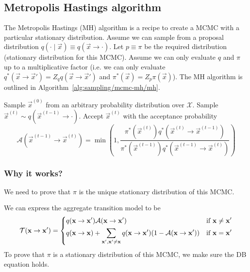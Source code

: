 \subsection{Metropolis Hastings algorithm}
\label{subsec:sampling/mcmc-mh/mh}
The Metropolis Hastings (MH) algorithm is a recipe to create a MCMC with a particular stationary distribution. Assume we can sample from a proposal distribution $q(\cdot \mid \vec x) \equiv q(\vec x \to \cdot)$. Let $p \equiv \pi$ be the required distribution (stationary distribution for this MCMC). Assume we can only evaluate $q$ and $\pi$ up to a multiplicative factor (i.e. we can only evaluate $q^\ast(\vec x \to \vec x') = Z_q q(\vec x \to \vec x')$ and $\pi^\ast(\vec x) = Z_p \pi(\vec x)$). The MH algorithm is outlined in Algorithm~\ref{alg:sampling/mcmc-mh/mh}.
\begin{algorithmbis}\label{alg:sampling/mcmc-mh/mh}
    \begin{algorithmic}[1]
        \State Sample $\vec x^{(0)}$ from an arbitrary probability distribution over $\mathcal X$.
            \Repeat
            \State Sample $\vec x^{(t)} \sim q(\vec x^{(t - 1)} \to \cdot)$.
            \State Accept $\vec x^{(t)}$ with the acceptance probability
                \begin{equation}
                    \mathcal A(\vec x^{(t - 1)} \to \vec x^{(t)}) = \min\left(1, \frac{\pi^\ast(\vec x^{(t)}) q^\ast(\vec x^{(t)} \to \vec x^{(t - 1)})}{\pi^\ast(\vec x^{(t - 1)}) q^\ast(\vec x^{(t - 1)} \to \vec x^{(t)})} \right)
                \end{equation}
        \EndFor
    \end{algorithmic}
\end{algorithmbis}

\subsubsection{Why it works?}
We need to prove that $\pi$ is the unique stationary distribution of this MCMC.

We can express the aggregate transition model to be
\begin{equation}
    \mathcal T(\vec x \to \vec x') = 
    \begin{dcases}
        q(\vec x \to \vec x')\mathcal A(\vec x \to \vec x')                                                                     & \text{if } \vec x \neq \vec x' \\
        q(\vec x \to \vec x) + \sum_{\vec x', \vec x' \neq \vec x} q(\vec x \to \vec x')(1 - \mathcal A(\vec x \to \vec x'))    & \text{if } \vec x = \vec x'
    \end{dcases}
\end{equation}
To prove that $\pi$ is a stationary distribution of this MCMC, we make sure the DB equation holds.

